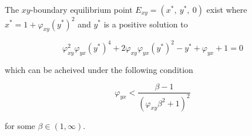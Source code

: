 \begin{theorem}\label{thm:eq-boundary-xy-exist}
    The $xy$-boundary equilibrium point $E_{xy}=\left(x^*,\ y^*,\ 0\right)$ exist where $x^*=1+\varphi_{xy}\left(y^*\right)^2$ and $y^*$ is a positive solution to

    \begin{equation*}
        \varphi_{xy}^2\varphi_{yx}\left(y^*\right)^4+2\varphi_{xy}\varphi_{yx}\left(y^*\right)^2-y^*+\varphi_{yx}+1=0
    \end{equation*}

    which can be acheived under the following condition
    
    \begin{equation*}
        \varphi_{yx}<\frac{\beta-1}{\left(\varphi_{xy}\beta^2+1\right)^2}
    \end{equation*}
    
    for some $\beta\in\left(1, \infty\right)$.
\end{theorem}
